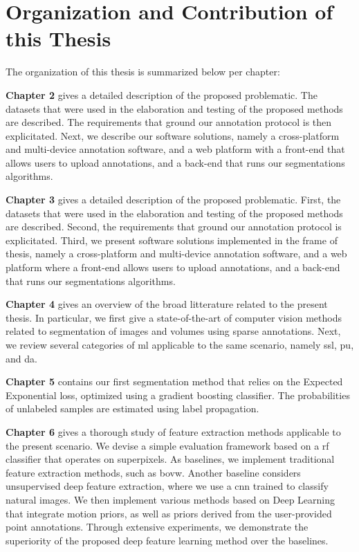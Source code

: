 \section{Organization and Contribution of this Thesis}
The organization of this thesis is summarized below per chapter:

\textbf{Chapter 2} gives a detailed description of the proposed problematic.
The datasets that were used in the elaboration and testing of the proposed methods are described.
The requirements that ground our annotation protocol is then explicitated.
Next, we describe our software solutions, namely a cross-platform and multi-device annotation software, and a web platform with a front-end that allows users to upload annotations, and a back-end that runs our segmentations algorithms.

\textbf{Chapter 3} gives a detailed description of the proposed problematic.
First, the datasets that were used in the elaboration and testing of the proposed methods are described.
Second, the requirements that ground our annotation protocol is explicitated.
Third, we present software solutions implemented in the frame of thesis, namely a cross-platform and multi-device annotation software, and a web platform where a front-end allows users to upload annotations, and a back-end that runs our segmentations algorithms.

\textbf{Chapter 4} gives an overview of the broad litterature related to the present thesis.
In particular, we first give a state-of-the-art of computer vision methods related to segmentation of images and volumes using sparse annotations.
Next, we review several categories of \gls{ml} applicable to the same scenario, namely \gls{ssl}, \gls{pu}, and \gls{da}.

\textbf{Chapter 5} contains our first segmentation method that relies on the Expected Exponential loss, optimized using a gradient boosting classifier. The probabilities of unlabeled samples are estimated using label propagation.

\textbf{Chapter 6} gives a thorough study of feature extraction methods applicable to the present scenario.
We devise a simple evaluation framework based on a \gls{rf} classifier that operates on superpixels.
As baselines, we implement traditional feature extraction methods, such as \gls{bovw}.
Another baseline considers unsupervised deep feature extraction, where we use a \gls{cnn} trained to classify natural images.
We then implement various methods based on Deep Learning that integrate motion priors, as well as priors derived from the user-provided point annotations.
Through extensive experiments, we demonstrate the superiority of the proposed deep feature learning method over the baselines.

